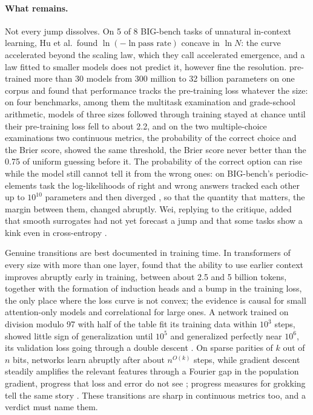 \begin{refsection}
\paragraph{What remains.} Not every jump dissolves. On 5 of 8 BIG-bench tasks of unnatural in-context learning, Hu et al.\ found $\ln(-\ln\text{pass rate})$ concave in $\ln N$: the curve accelerated beyond the scaling law, which they call accelerated emergence, and a law fitted to smaller models does not predict it, however fine the resolution. \Textcite{DuEtAl2024} pre-trained more than 30 models from 300 million to 32 billion parameters on one corpus and found that performance tracks the pre-training loss whatever the size: on four benchmarks, among them the multitask examination and grade-school arithmetic, models of three sizes followed through training stayed at chance until their pre-training loss fell to about 2.2, and on the two multiple-choice examinations two continuous metrics, the probability of the correct choice and the Brier score, showed the same threshold, the Brier score never better than the 0.75 of uniform guessing before it. The probability of the correct option can rise while the model still cannot tell it from the wrong ones: on BIG-bench's periodic-elements task the log-likelihoods of right and wrong answers tracked each other up to $10^{10}$ parameters and then diverged \parencite{SrivastavaEtAl2023}, so that the quantity that matters, the margin between them, changed abruptly. Wei, replying to the critique, added that smooth surrogates had not yet forecast a jump and that some tasks show a kink even in cross-entropy \parencite{Wei2023Blog}.

Genuine transitions are best documented in training time. In transformers of every size with more than one layer, \textcite{OlssonEtAl2022} found that the ability to use earlier context improves abruptly early in training, between about 2.5 and 5 billion tokens, together with the formation of induction heads and a bump in the training loss, the only place where the loss curve is not convex; the evidence is causal for small attention-only models and correlational for large ones. A network trained on division modulo 97 with half of the table fit its training data within $10^3$ steps, showed little sign of generalization until $10^5$ and generalized perfectly near $10^6$, its validation loss going through a double descent \parencite{PowerEtAl2022}. On sparse parities of $k$ out of $n$ bits, networks learn abruptly after about $n^{O(k)}$ steps, while gradient descent steadily amplifies the relevant features through a Fourier gap in the population gradient, progress that loss and error do not see \parencite{BarakEtAl2022}; progress measures for grokking tell the same story \parencite{NandaEtAl2023}. These transitions are sharp in continuous metrics too, and a verdict must name them.


\end{refsection}
